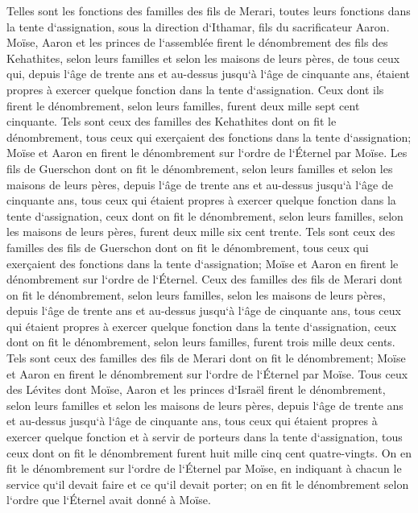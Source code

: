 \verse Telles sont les fonctions des familles des fils de Merari, toutes leurs fonctions dans la tente d`assignation, sous la direction d`Ithamar, fils du sacrificateur Aaron. 
\verse Moïse, Aaron et les princes de l`assemblée firent le dénombrement des fils des Kehathites, selon leurs familles et selon les maisons de leurs pères, 
\verse de tous ceux qui, depuis l`âge de trente ans et au-dessus jusqu`à l`âge de cinquante ans, étaient propres à exercer quelque fonction dans la tente d`assignation. 
\verse Ceux dont ils firent le dénombrement, selon leurs familles, furent deux mille sept cent cinquante. 
\verse Tels sont ceux des familles des Kehathites dont on fit le dénombrement, tous ceux qui exerçaient des fonctions dans la tente d`assignation; Moïse et Aaron en firent le dénombrement sur l`ordre de l`Éternel par Moïse. 
\verse Les fils de Guerschon dont on fit le dénombrement, selon leurs familles et selon les maisons de leurs pères, 
\verse depuis l`âge de trente ans et au-dessus jusqu`à l`âge de cinquante ans, tous ceux qui étaient propres à exercer quelque fonction dans la tente d`assignation, 
\verse ceux dont on fit le dénombrement, selon leurs familles, selon les maisons de leurs pères, furent deux mille six cent trente. 
\verse Tels sont ceux des familles des fils de Guerschon dont on fit le dénombrement, tous ceux qui exerçaient des fonctions dans la tente d`assignation; Moïse et Aaron en firent le dénombrement sur l`ordre de l`Éternel. 
\verse Ceux des familles des fils de Merari dont on fit le dénombrement, selon leurs familles, selon les maisons de leurs pères, 
\verse depuis l`âge de trente ans et au-dessus jusqu`à l`âge de cinquante ans, tous ceux qui étaient propres à exercer quelque fonction dans la tente d`assignation, 
\verse ceux dont on fit le dénombrement, selon leurs familles, furent trois mille deux cents. 
\verse Tels sont ceux des familles des fils de Merari dont on fit le dénombrement; Moïse et Aaron en firent le dénombrement sur l`ordre de l`Éternel par Moïse. 
\verse Tous ceux des Lévites dont Moïse, Aaron et les princes d`Israël firent le dénombrement, selon leurs familles et selon les maisons de leurs pères, 
\verse depuis l`âge de trente ans et au-dessus jusqu`à l`âge de cinquante ans, tous ceux qui étaient propres à exercer quelque fonction et à servir de porteurs dans la tente d`assignation, 
\verse tous ceux dont on fit le dénombrement furent huit mille cinq cent quatre-vingts. 
\verse On en fit le dénombrement sur l`ordre de l`Éternel par Moïse, en indiquant à chacun le service qu`il devait faire et ce qu`il devait porter; on en fit le dénombrement selon l`ordre que l`Éternel avait donné à Moïse. 

